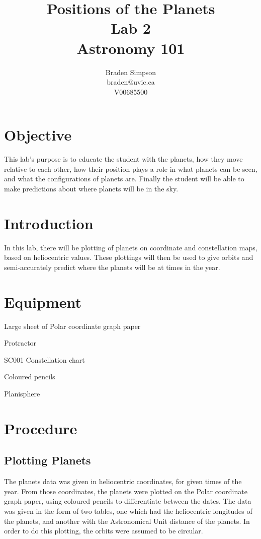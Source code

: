 \documentclass{article}
\begin{document}
\title{Positions of the Planets \\ Lab 2 \\ Astronomy 101}
\author{
Braden Simpson \\ braden@uvic.ca \\ V00685500
}
\maketitle

\section{Objective}
This lab’s purpose is to educate the student with the planets, how they move relative to each other, how their position plays a role in what planets can be seen, and what the configurations of planets are.  Finally the student will be able to make predictions about where planets will be in the sky.
\section{Introduction}
In this lab, there will be plotting of planets on coordinate and constellation maps, based on heliocentric values.  These plottings will then be used to give orbits and semi-accurately predict where the planets will be at times in the year.
\section{Equipment}
\begin{list}{*}{}
\item Large sheet of Polar coordinate graph paper
\item Protractor
\item SC001 Constellation chart
\item Coloured pencils
\item Planisphere
\end{list}
\section{Procedure}
\subsection{Plotting Planets}
The planets data was given in heliocentric coordinates, for given times of the year.  From those coordinates, the planets were plotted on the Polar coordinate graph paper, using coloured pencils to differentiate between the dates.  The data was given in the form of two tables, one which had the heliocentric longitudes of the planets, and another with the Astronomical Unit distance of the planets.  In order to do this plotting, the orbits were assumed to be circular. 
\end{document}
